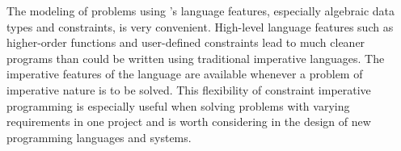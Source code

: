 The modeling of problems using \turtle{}'s language features,
especially algebraic data types and constraints, is very convenient.
High-level language features such as higher-order functions and
user-defined constraints lead to much cleaner programs than could be
written using traditional imperative languages.  The imperative
features of the language are available whenever a problem of
imperative nature is to be solved.  This flexibility of constraint
imperative programming is especially useful when solving problems with
varying requirements in one project and is worth considering in the
design of new programming languages and systems.



